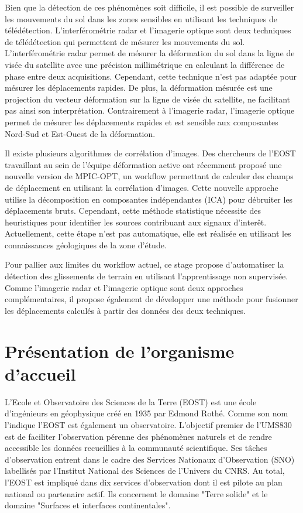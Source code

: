 \documentclass[11pt, openany]{report}
\begin{document}
Bien que la détection de ces phénomènes soit difficile, il est possible de surveiller les mouvements du sol dans les zones sensibles en utilisant les techniques de télédétection. L'interférométrie radar et l'imagerie optique sont deux techniques de télédétection qui permettent de mésurer les mouvements du sol. L'interférométrie radar permet de mésurer la déformation du sol dans la ligne de visée du satellite avec une précision millimétrique en calculant la différence de phase entre deux acquisitions. Cependant, cette technique n'est pas adaptée pour mésurer les déplacements rapides. De plus, la déformation mésurée est une projection du vecteur déformation sur la ligne de visée du satellite, ne facilitant pas ainsi son interprétation. Contrairement à l'imagerie radar, l'imagerie optique permet de mésurer les déplacements rapides et est sensible aux composantes Nord-Sud et Est-Ouest de la déformation.

Il existe plusieurs algorithmes de corrélation d'images. Des chercheurs de l'EOST travaillant au sein de l'équipe déformation active ont récemment proposé une nouvelle version de MPIC-OPT, un workflow permettant de calculer des champs de déplacement en utilisant la corrélation d'images. Cette nouvelle approche utilise la décomposition en composantes indépendantes (ICA) pour débruiter les déplacements bruts. Cependant, cette méthode statistique nécessite des heuristiques pour identifier les sources contribuant aux signaux d'interêt. Actuellement, cette étape n'est pas automatique, elle est réalisée en utilisant les connaissances géologiques de la zone d'étude.\par

Pour pallier aux limites du workflow actuel, ce stage propose d'automatiser la détection des glissements de terrain en utilisant l'apprentissage non supervisée. Comme l'imagerie radar et l'imagerie optique sont deux approches complémentaires, il propose également de développer une méthode pour fusionner les déplacements calculés à partir des données des deux techniques.

\chapter{Présentation de l'organisme d'accueil}
L'Ecole et Observatoire des Sciences de la Terre (EOST) est une école d'ingénieurs en géophysique
créé en 1935 par Edmond Rothé. Comme son nom l'indique l'EOST est également un observatoire. L’objectif premier de l’UMS830 est de faciliter l'observation pérenne des phénomènes naturels et de rendre accessible les données recueillies à la communauté scientifique. Ses tâches d'observation entrent dans le cadre des Services Nationaux d'Observation (SNO) labellisés par l'Institut National des Sciences de l'Univers du CNRS. Au total, l'EOST est impliqué dans dix services d'observation dont il est pilote au plan national ou partenaire actif. Ils concernent le domaine "Terre solide" et le domaine "Surfaces et interfaces continentales".
\end{document}
